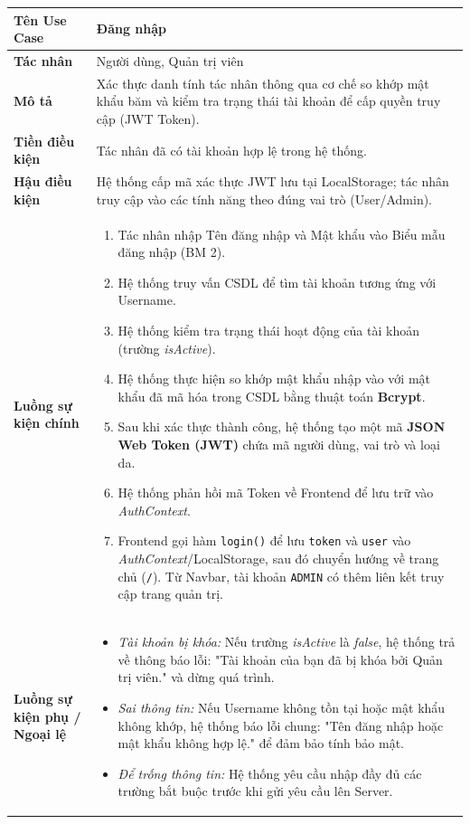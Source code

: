 \documentclass[12pt,a4paper]{article}
\begin{document}
\begin{center}
\renewcommand{\arraystretch}{1.4}
\begin{tabular}{|p{4cm}|p{10cm}|}
\hline
\rowcolor{blue!15}
\textbf{Tên Use Case} & \textbf{Đăng nhập} \\ \hline
\textbf{Tác nhân} & Người dùng, Quản trị viên \\ \hline
\textbf{Mô tả} & Xác thực danh tính tác nhân thông qua cơ chế so khớp mật khẩu băm và kiểm tra trạng thái tài khoản để cấp quyền truy cập (JWT Token). \\ \hline
\textbf{Tiền điều kiện} & Tác nhân đã có tài khoản hợp lệ trong hệ thống. \\ \hline
\textbf{Hậu điều kiện} & Hệ thống cấp mã xác thực JWT lưu tại LocalStorage; tác nhân truy cập vào các tính năng theo đúng vai trò (User/Admin). \\ \hline
\textbf{Luồng sự kiện chính} & 
\begin{enumerate}
    \item Tác nhân nhập Tên đăng nhập và Mật khẩu vào Biểu mẫu đăng nhập (BM 2).
    \item Hệ thống truy vấn CSDL để tìm tài khoản tương ứng với Username.
    \item Hệ thống kiểm tra trạng thái hoạt động của tài khoản (trường \textit{isActive}).
    \item Hệ thống thực hiện so khớp mật khẩu nhập vào với mật khẩu đã mã hóa trong CSDL bằng thuật toán \textbf{Bcrypt}.
    \item Sau khi xác thực thành công, hệ thống tạo một mã \textbf{JSON Web Token (JWT)} chứa mã người dùng, vai trò và loại da.
    \item Hệ thống phản hồi mã Token về Frontend để lưu trữ vào \textit{AuthContext}.
    \item Frontend gọi hàm \texttt{login()} để lưu \texttt{token} và \texttt{user} vào \textit{AuthContext}/LocalStorage, sau đó chuyển hướng về trang chủ (\texttt{/}). Từ Navbar, tài khoản \texttt{ADMIN} có thêm liên kết truy cập trang quản trị.
\end{enumerate} \\ \hline
\textbf{Luồng sự kiện phụ / Ngoại lệ} & 
\begin{itemize}
    \item \textit{Tài khoản bị khóa:} Nếu trường \textit{isActive} là \textit{false}, hệ thống trả về thông báo lỗi: "Tài khoản của bạn đã bị khóa bởi Quản trị viên." và dừng quá trình.
    \item \textit{Sai thông tin:} Nếu Username không tồn tại hoặc mật khẩu không khớp, hệ thống báo lỗi chung: "Tên đăng nhập hoặc mật khẩu không hợp lệ." để đảm bảo tính bảo mật.
    \item \textit{Để trống thông tin:} Hệ thống yêu cầu nhập đầy đủ các trường bắt buộc trước khi gửi yêu cầu lên Server.
\end{itemize} \\ \hline
\end{tabular}
\end{center}
\end{document}
